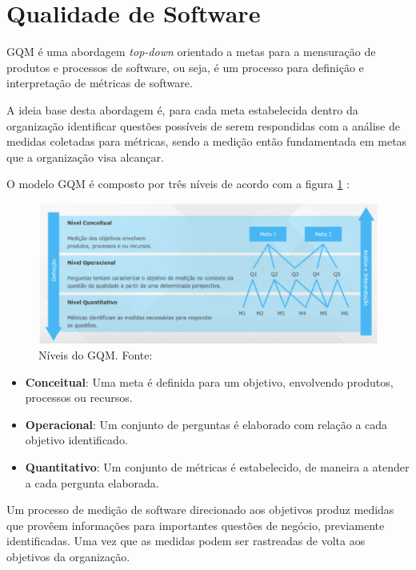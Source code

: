\section{Qualidade de Software}

GQM é uma abordagem \textit{top-down} orientado a metas para a mensuração de produtos e processos de software, ou seja, é um processo para definição e interpretação de métricas de software. \cite{junior}

A ideia base desta abordagem é, para cada meta estabelecida dentro da organização identificar questões possíveis de serem respondidas com a análise de medidas coletadas para métricas, sendo a medição então fundamentada em metas que a organização visa alcançar.

O modelo GQM é composto por três níveis de acordo com a figura \ref{fig:gqm} \cite{junior}:

\begin{figure}[h!]
	\centering
  \includegraphics[keepaspectratio=true,scale=0.5]{figuras/gqm.eps}
  \caption[Níveis do GQM.]{Níveis do GQM. Fonte: \cite{junior}}
	\label{fig:gqm}
\end{figure}

\begin{itemize}
  \item \textbf{Conceitual}: Uma meta é definida para um objetivo, envolvendo produtos, processos ou recursos.
  \item \textbf{Operacional}: Um conjunto de perguntas é elaborado com relação a cada objetivo identificado.
  \item \textbf{Quantitativo}: Um conjunto de métricas é estabelecido, de maneira a atender a cada pergunta elaborada.
\end{itemize}

Um processo de medição de software direcionado aos objetivos produz medidas que provêem informações para importantes questões de negócio, previamente identificadas. Uma vez que as medidas podem ser rastreadas de volta aos objetivos da organização.
